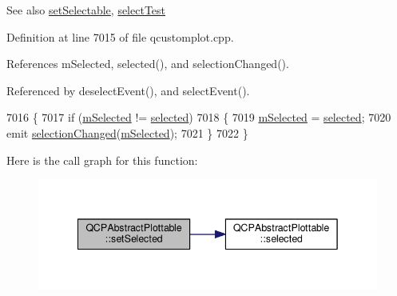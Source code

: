 \begin{DoxySeeAlso}{See also}
\hyperlink{class_q_c_p_abstract_plottable_a22c69299eb5569e0f6bf084877a37dc4}{set\+Selectable}, \hyperlink{class_q_c_p_abstract_plottable_a38efe9641d972992a3d44204bc80ec1d}{select\+Test} 
\end{DoxySeeAlso}


Definition at line 7015 of file qcustomplot.\+cpp.



References m\+Selected, selected(), and selection\+Changed().



Referenced by deselect\+Event(), and select\+Event().


\begin{DoxyCode}
7016 \{
7017   \textcolor{keywordflow}{if} (\hyperlink{class_q_c_p_abstract_plottable_a43f68a0603e9bcd016bdfa6d9d5c41c9}{mSelected} != \hyperlink{class_q_c_p_abstract_plottable_ab901903adcb0e29467d63de72340ab29}{selected})
7018   \{
7019     \hyperlink{class_q_c_p_abstract_plottable_a43f68a0603e9bcd016bdfa6d9d5c41c9}{mSelected} = \hyperlink{class_q_c_p_abstract_plottable_ab901903adcb0e29467d63de72340ab29}{selected};
7020     emit \hyperlink{class_q_c_p_abstract_plottable_a3af66432b1dca93b28e00e78a8c7c1d9}{selectionChanged}(\hyperlink{class_q_c_p_abstract_plottable_a43f68a0603e9bcd016bdfa6d9d5c41c9}{mSelected});
7021   \}
7022 \}
\end{DoxyCode}


Here is the call graph for this function\+:\nopagebreak
\begin{figure}[H]
\begin{center}
\leavevmode
\includegraphics[width=342pt]{class_q_c_p_abstract_plottable_afbd5428c2952f59d952e11ab5cd79176_cgraph}
\end{center}
\end{figure}




